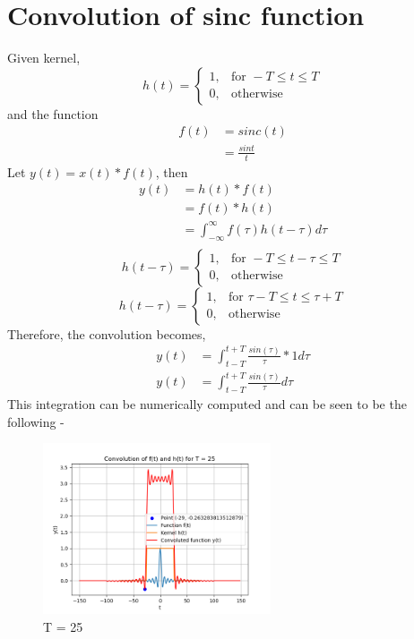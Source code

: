\documentclass[12pt]{article}
\begin{document}
\section{Convolution of sinc function}

Given kernel, 
\[
h(t) =
\begin{cases}
1, & \text{for } -T \leq t \leq T \\
0, & \text{otherwise}
\end{cases}
\]
and the function 
\begin{align*}
f(t) &= sinc(t) \\
     &= \frac{sint}{t}
\end{align*}
Let $y(t) = x(t) * f(t)$, then
\begin{align*}
	y(t) &= h(t) * f(t) \\
             &= f(t) * h(t) \\
             &= \int_{-\infty}^{\infty} f(\tau) h(t - \tau) d \tau \\
\end{align*}
\[
h(t - \tau) =
\begin{cases}
1, & \text{for } -T \leq t - \tau \leq T \\
0, & \text{otherwise}
\end{cases}
\]
\[
h(t - \tau) =
\begin{cases}
1, & \text{for } \tau - T \leq t \leq \tau + T \\
0, & \text{otherwise}
\end{cases}
\]
Therefore, the convolution becomes, 
\begin{align*}
	y(t) &= \int_{t - T}^{t + T} \frac{sin(\tau)}{\tau} * 1 d\tau \\
	y(t) &= \int_{t - T}^{t + T} \frac{sin(\tau)}{\tau} d\tau
\end{align*}
This integration can be numerically computed and can be seen to be the following - \\
\begin{figure}[!ht]
    \centering
    \includegraphics[width=0.6\textwidth]{figs/Conv_sinc.png}
    \caption{T = 25}
    \label{fig:conv_sinc}
\end{figure}
\end{document}
